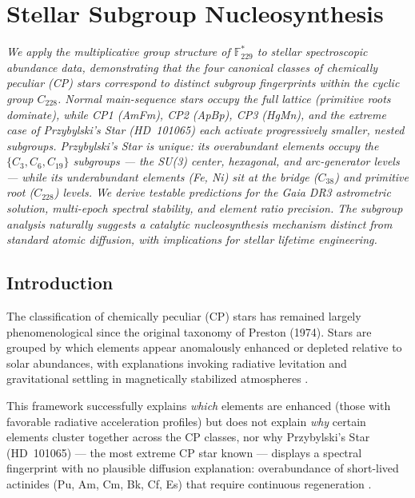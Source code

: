 \newpage
\chapter{Stellar Subgroup Nucleosynthesis}
\label{ch:stellar-nucleosynthesis}

\noindent\textit{We apply the multiplicative group structure of $\mathbb{F}_{229}^*$ to stellar
spectroscopic abundance data, demonstrating that the four canonical classes of
chemically peculiar (CP) stars correspond to distinct \emph{subgroup fingerprints}
within the cyclic group $C_{228}$. Normal main-sequence stars occupy the full
lattice (primitive roots dominate), while CP1 (AmFm), CP2 (ApBp), CP3 (HgMn),
and the extreme case of Przybylski's Star (HD~101065) each activate progressively
smaller, nested subgroups. Przybylski's Star is unique: its overabundant elements
occupy the $\{C_3, C_6, C_{19}\}$ subgroups --- the SU(3) center, hexagonal, and
arc-generator levels --- while its underabundant elements (Fe, Ni) sit at the bridge
($C_{38}$) and primitive root ($C_{228}$) levels. We derive testable predictions for
the Gaia DR3 astrometric solution, multi-epoch spectral stability, and element ratio
precision. The subgroup analysis naturally suggests a \emph{catalytic nucleosynthesis}
mechanism distinct from standard atomic diffusion, with implications for stellar
lifetime engineering.}

\section{Introduction}
\label{sec:stellar-intro}

The classification of chemically peculiar (CP) stars has remained largely
phenomenological since the original taxonomy of Preston (1974). Stars are grouped
by which elements appear anomalously enhanced or depleted relative to solar
abundances, with explanations invoking radiative levitation and gravitational
settling in magnetically stabilized atmospheres \cite{michaud1970,richer2000}.

This framework successfully explains \emph{which} elements are enhanced (those
with favorable radiative acceleration profiles) but does not explain \emph{why}
certain elements cluster together across the CP classes, nor why Przybylski's Star
(HD~101065) --- the most extreme CP star known --- displays a spectral fingerprint
with no plausible diffusion explanation: overabundance of short-lived actinides
(Pu, Am, Cm, Bk, Cf, Es) that require continuous regeneration
\cite{cowley2000,gopka2004}.

